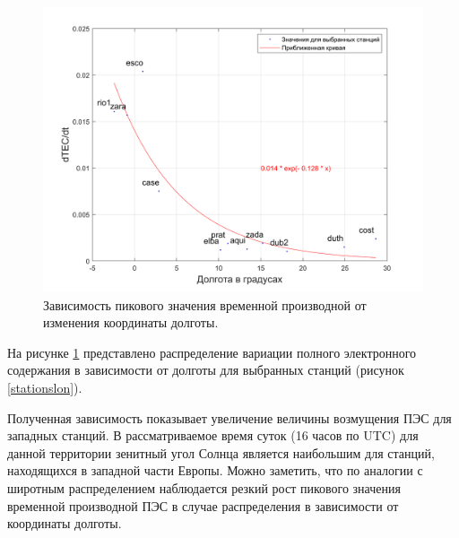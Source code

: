 \documentclass[a4paper]{article}
\begin{document}
\begin{figure}[H]
\centering
\includegraphics[width = 0.8\linewidth]{pics/clean_pics/dtec_lon.png}
\caption{Зависимость пикового значения временной производной от изменения координаты долготы.}
\label{dteclon}
\end{figure}

На рисунке \ref{dteclon} представлено распределение вариации полного электронного содержания в зависимости от долготы для выбранных станций (рисунок \ref{stationslon}).

Полученная зависимость показывает увеличение величины возмущения ПЭС для западных станций. В рассматриваемое время суток (16 часов по UTC) для данной территории  зенитный угол Солнца является наибольшим для станций, находящихся в западной части Европы. 
Можно заметить, что по аналогии с широтным распределением наблюдается резкий рост пикового значения временной производной ПЭС в случае распределения в зависимости от координаты долготы.



\end{document}
